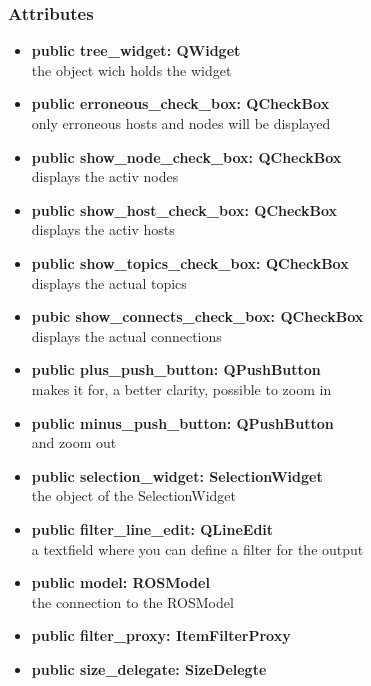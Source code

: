 \subsubsection{Attributes}
\begin{itemize}
  \item \textbf{public tree\_widget: QWidget}\\
  the object wich holds the widget
  \item \textbf{public erroneous\_check\_box: QCheckBox}\\
  only erroneous hosts and nodes will be displayed
  \item \textbf{public show\_node\_check\_box: QCheckBox}\\
  displays the activ nodes
  \item \textbf{public show\_host\_check\_box: QCheckBox}\\
  displays the activ hosts
  \item \textbf{public show\_topics\_check\_box: QCheckBox}\\
  displays the actual topics
  \item \textbf{pubic show\_connects\_check\_box: QCheckBox}\\
  displays the actual connections
  \item \textbf{public plus\_push\_button: QPushButton}\\
  makes it for, a better clarity, possible to zoom in  
  \item \textbf{public minus\_push\_button: QPushButton}\\
  and zoom out
  \item \textbf{public selection\_widget: SelectionWidget}\\
  the object of the SelectionWidget
  \item \textbf{public filter\_line\_edit: QLineEdit}\\
  a textfield where you can define a filter for the output
  \item \textbf{public model: ROSModel}\\
  the connection to the ROSModel
  \item \textbf{public filter\_proxy: ItemFilterProxy}\\
  
  \item \textbf{public size\_delegate: SizeDelegte}\\
  
\end{itemize}
